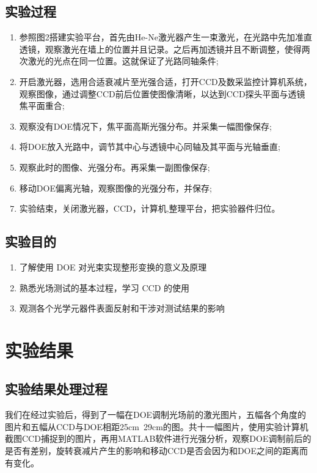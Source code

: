 \documentclass[UTF8]{ctexart}
\begin{document}
	\subsection{实验过程}
	\begin{enumerate}
\item 参照图2搭建实验平台，首先由He-Ne激光器产生一束激光，在光路中先加准直透镜，观察激光在墙上的位置并且记录。之后再加透镜并且不断调整，使得两次激光的光点在同一位置。这就保证了光路同轴条件;
\item 开启激光器，选用合适衰减片至光强合适，打开CCD及数采监控计算机系统，观察图像，通过调整CCD前后位置使图像清晰，以达到CCD探头平面与透镜焦平面重合;
\item 观察没有DOE情况下，焦平面高斯光强分布。并采集一幅图像保存;
\item 将DOE放入光路中，调节其中心与透镜中心同轴及其平面与光轴垂直;
\item 观察此时的图像、光强分布。再采集一副图像保存;
\item 移动DOE偏离光轴，观察图像的光强分布，并保存;	
\item 实验结束，关闭激光器，CCD，计算机,整理平台，把实验器件归位。
	\end{enumerate}
	\subsection{实验目的}	
	\begin{enumerate}
	\item 了解使用 DOE 对光束实现整形变换的意义及原理 
	\item 熟悉光场测试的基本过程，学习 CCD 的使用 
	\item 观测各个光学元器件表面反射和干涉对测试结果的影响 
	\end{enumerate}

\section{实验结果}
	\subsection{实验结果处理过程}
我们在经过实验后，得到了一幅在DOE调制光场前的激光图片，五幅各个角度的图片和五幅从CCD与DOE相距25cm~29cm的图。共十一幅图片，使用实验计算机截图CCD捕捉到的图片，再用MATLAB软件进行光强分析，观察DOE调制前后的是否有差别，旋转衰减片产生的影响和移动CCD是否会因为和DOE之间的距离而有变化。
\end{document}
